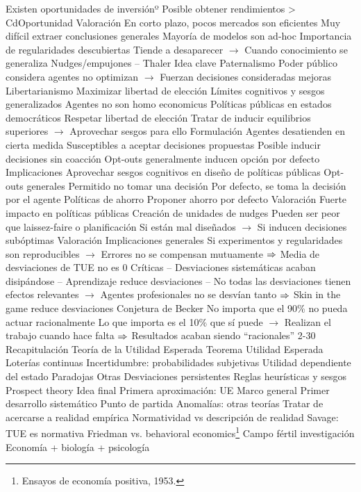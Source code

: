 \documentclass{nuevotema}
\begin{document}
\begin{esquemal}
				\4 Existen oportunidades de inversiónº
				\4[] Posible obtener rendimientos > CdOportunidad
			\3 Valoración
				\4 En corto plazo, pocos mercados son eficientes
				\4 Muy difícil extraer conclusiones generales
				\4[] Mayoría de modelos son ad-hoc
				\4 Importancia de regularidades descubiertas
				\4[] Tiende a desaparecer
				\4[] $\to$ Cuando conocimiento se generaliza
		\2 Nudges/empujones -- Thaler
			\3 Idea clave
				\4 Paternalismo
				\4[] Poder público considera agentes no optimizan
				\4[] $\to$ Fuerzan decisiones consideradas mejoras
				\4 Libertarianismo
				\4[] Maximizar libertad de elección
				\4 Límites cognitivos y sesgos generalizados
				\4[] Agentes no son homo economicus
				\4 Políticas públicas en estados democráticos
				\4[] Respetar libertad de elección
				\4[] Tratar de inducir equilibrios superiores
				\4[] $\to$ Aprovechar sesgos para ello
			\3 Formulación
				\4 Agentes desatienden en cierta medida
				\4 Susceptibles a aceptar decisiones propuestas
				\4[$\then$] Posible inducir decisiones sin coacción
				\4[$\then$] Opt-outs generalmente inducen opción por defecto
			\3 Implicaciones
				\4 Aprovechar sesgos cognitivos en diseño de políticas públicas
				\4 Opt-outs generales
				\4[] Permitido no tomar una decisión
				\4[] Por defecto, se toma la decisión por el agente
				\4 Políticas de ahorro
				\4[] Proponer ahorro por defecto
			\3 Valoración
				\4 Fuerte impacto en políticas públicas
				\4 Creación de unidades de nudges
				\4 Pueden ser peor que laissez-faire o planificación
				\4[] Si están mal diseñados
				\4[] $\to$ Si inducen decisiones subóptimas
		\2 Valoración
			\3 Implicaciones generales
				\4[] Si experimentos y regularidades son reproducibles
				\4[] $\to$ Errores no se compensan mutuamente
				\4[] $\then$ Media de desviaciones de TUE no es 0
			\3 Críticas
				\4[] -- Desviaciones sistemáticas acaban disipándose
				\4[] -- Aprendizaje reduce desviaciones
				\4[] -- No todas las desviaciones tienen efectos relevantes
				\4[] $\to$ Agentes profesionales no se desvían tanto
				\4[] $\then$ Skin in the game reduce desviaciones
			\3 Conjetura de Becker
				\4[] No importa que el 90\% no pueda actuar racionalmente
				\4[] Lo que importa es el 10\% que sí puede
				\4[] $\to$ Realizan el trabajo cuando hace falta
				\4[] $\then$ Resultados acaban siendo ``racionales''
	\1[]  2-30
		\2 Recapitulación
			\3 Teoría de la Utilidad Esperada
				\4 Teorema Utilidad Esperada
				\4 Loterías continuas
				\4 Incertidumbre: probabilidades subjetivas
				\4 Utilidad dependiente del estado
				\4 Paradojas
			\3 Otras
				\4 Desviaciones persistentes
				\4 Reglas heurísticas y sesgos
				\4 Prospect theory
				\4
		\2 Idea final
			\3 Primera aproximación: UE
				\4 Marco general
				\4 Primer desarrollo sistemático
				\4 Punto de partida
			\3 Anomalías: otras teorías
				\4 Tratar de acercarse a realidad empírica
			\3 Normatividad vs descripción de realidad
				\4 Savage: TUE es normativa
				\4 Friedman vs. behavioral economics\footnote{Ensayos de economía positiva, 1953.}
			\3 Campo fértil investigación
				\4 Economía + biología + psicología
\end{esquemal}
\end{document}
